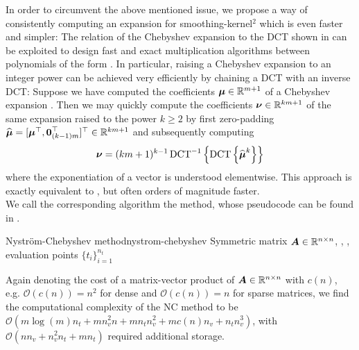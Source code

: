 In order to circumvent the above mentioned issue, we propose a way of consistently computing
an expansion for \gls{smoothing-kernel}$^2$ which is even faster and simpler:
The relation of the Chebyshev expansion to the \gls{DCT} shown in 
can be exploited to design fast and exact multiplication algorithms between polynomials
of the form  \cite[Proposition~3.1]{baszenski1997cosine}.
In particular, raising a Chebyshev expansion to an integer power can be achieved
very efficiently by chaining a \gls{DCT} with an inverse \gls{DCT}:
Suppose we have computed the coefficients $\boldsymbol{\mu} \in \mathbb{R}^{m+1}$
of a Chebyshev expansion .
Then we may quickly compute the coefficients $\boldsymbol{\nu} \in \mathbb{R}^{km+1}$
of the same expansion raised to the power $k \geq 2$ by first zero-padding
$\widehat{\boldsymbol{\mu}} = [\boldsymbol{\mu}^{\top}, \boldsymbol{0}_{(k-1)m}^{\top}]^{\top} \in \mathbb{R}^{km+1}$
and subsequently computing
\begin{equation}
    \boldsymbol{\nu} = (km + 1)^{k - 1} \operatorname{DCT}^{-1}\left\{ \operatorname{DCT}\left\{\widehat{\boldsymbol{\mu}}^{k}\right\} \right\}
    \label{equ:3-nystrom-chebyshev-potentiate-coefficients}
\end{equation}
where the exponentiation of a vector is understood elementwise.
This approach is exactly equivalent to \cite[Algorithm~5]{lin2017randomized}, but
often orders of magnitude faster.\\

We call the corresponding algorithm the  method, whose pseudocode
can be found in .
\begin{algo}{Nystr\"om-Chebyshev method}{nystrom-chebyshev}
    Symmetric matrix $\boldsymbol{A} \in \mathbb{R}^{n \times n}$, , ,
    evaluation points $\{t_i\}_{i=1}^{n_t}$
    
\end{algo}

Again denoting the cost of a matrix-vector product of $\boldsymbol{A} \in \mathbb{R}^{n \times n}$
with $c(n)$, e.g. $\mathcal{O}(c(n)) = n^2$ for dense and $\mathcal{O}(c(n)) = n$
for sparse matrices, we find the computational complexity of the \gls{NC}
method to be $\mathcal{O}(m \log(m) n_t + m n_v^2 n + m n_t n_v^2 +  m c(n) n_v + n_t n_v^3)$, with
$\mathcal{O}(n n_v + n_v^2 n_t + m n_t)$ required additional storage.


